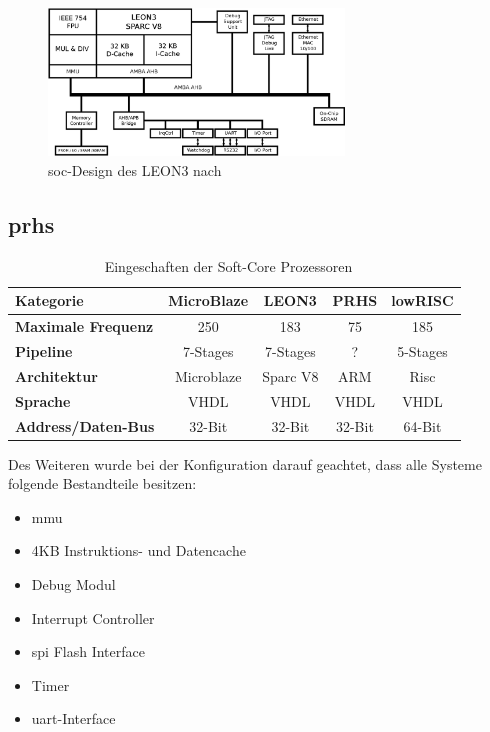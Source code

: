 \begin{figure}[H]
\centering
\includegraphics[width=0.7\textwidth]{Hauptteil/leon3.eps}
\caption{\ac{soc}-Design des LEON3 nach~\cite{comparison}}
\label{fig:leon}
\end{figure}

\subsection{\ac{prhs}}\label{kap:prhs}





\begin{table}[H]
\centering
\begin{tabular}{|l|c|c|c|c|}
  \hline
  \textbf{Kategorie} & \textbf{MicroBlaze} & \textbf{LEON3}& \textbf{PRHS}& \textbf{lowRISC}\\
  \hline
  \textbf{Maximale Frequenz} &250 & 183 & 75 & 185\\
  \hline
  \textbf{Pipeline} & 7-Stages & 7-Stages & ? & 5-Stages\\
  \hline
  \textbf{Architektur} & Microblaze & Sparc V8  & ARM &  Risc\\
  \hline
  \textbf{Sprache} & VHDL & VHDL & VHDL & VHDL\\
    \hline
  \textbf{Address/Daten-Bus} & 32-Bit & 32-Bit & 32-Bit & 64-Bit\\
      \hline
\end{tabular}
  \caption{Eingeschaften der Soft-Core Prozessoren ~\cite{comparison}}
 \label{tab:features}
  \end{table}

Des Weiteren wurde bei der Konfiguration darauf geachtet, dass alle Systeme folgende Bestandteile besitzen:\\
\begin{itemize}
  \item \ac{mmu}
  \item 4KB Instruktions- und Datencache
  \item Debug Modul
  \item Interrupt Controller
  \item \ac{spi} Flash Interface
  \item Timer
  \item \ac{uart}-Interface
\end{itemize}


